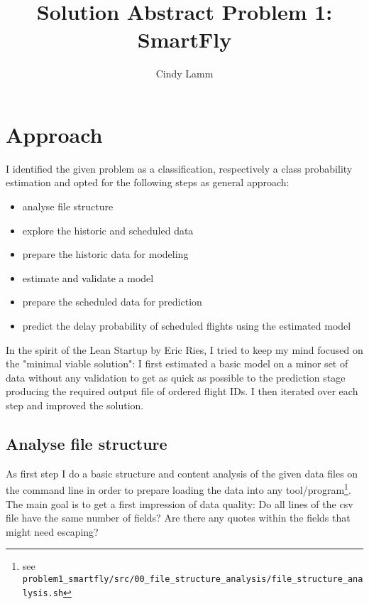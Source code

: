 \documentclass{article}\usepackage[]{graphicx}\usepackage[]{color}
\begin{document}
\VerbatimFootnotes

\author{Cindy Lamm}
\title{Solution Abstract Problem 1: SmartFly}

\maketitle


\section{Approach} %
\label{approach}

I identified the given problem as a classification, respectively a class probability estimation and opted for the following steps as general approach:
\begin{itemize}
	\item analyse file structure
	\item explore the historic and scheduled data
	\item prepare the historic data for modeling
	\item estimate \textcolor{black}{and validate} a model
	\item prepare the scheduled data for prediction
	\item predict the delay probability of scheduled flights using the estimated model
\end{itemize}



In the spirit of the Lean Startup by Eric Ries, I tried to keep my mind focused on the "minimal viable solution": I first estimated a basic model on a minor set of data without any validation to get as quick as possible to the prediction stage producing the required output file of ordered flight IDs. I then iterated over each step and improved the solution.



\subsection{Analyse file structure} %
\label{sub:analyse_file_structure}
As first step I do a basic structure and content analysis of the given data files on the command line in order to prepare loading the data into any tool/program\footnote{see \verb+problem1_smartfly/src/00_file_structure_analysis/file_structure_analysis.sh+ }. The main goal is to get a first impression of data quality: Do all lines of the csv file have the same number of fields? Are there any quotes within the fields that might need escaping?
\end{document}
